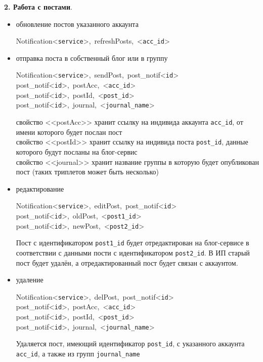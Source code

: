 {\bf 2. Работа с постами}.
\begin{itemize}
\item обновление постов указанного аккаунта

\mbox{Notification<{\tt service}>, refreshPosts, <{\tt acc\_id}>}

\item отправка поста в собственный блог или в группу

\mbox{Notification<{\tt service}>, sendPost, post\_notif<{\tt id}>}\\
\mbox{post\_notif<{\tt id}>, postAcc, <{\tt acc\_id}>}\\
\mbox{post\_notif<{\tt id}>, postId, <{\tt post\_id}>}\\
\mbox{post\_notif<{\tt id}>, journal, <{\tt journal\_name}>}

свойство <<postAcc>> хранит ссылку на индивида аккаунта {\tt acc\_id}, от имени которого будет послан пост\\
свойство <<postId>> хранит ссылку на индивида поста {\tt post\_id}, данные которого будут посланы на блог-сервис\\
свойство <<journal>> хранит название группы в которую будет опубликован пост (таких триплетов может быть несколько)

\item редактирование

\mbox{Notification<{\tt service}>, editPost, post\_notif<{\tt id}>}\\
\mbox{post\_notif<{\tt id}>, oldPost, <{\tt post1\_id}>}\\
\mbox{post\_notif<{\tt id}>, newPost, <{\tt post2\_id}>}

Пост с идентификатором {\tt post1\_id} будет отредактирован на блог-сервисе в соответствии с данными пости с идентификатором {\tt post2\_id}. В ИП старый пост будет удалён, а отредактированный пост будет связан с аккаунтом.

\item удаление


\mbox{Notification<{\tt service}>, delPost, post\_notif<{\tt id}>}\\
\mbox{post\_notif<{\tt id}>, postAcc, <{\tt acc\_id}>}\\
\mbox{post\_notif<{\tt id}>, postId, <{\tt post\_id}>}\\
\mbox{post\_notif<{\tt id}>, journal, <{\tt journal\_name}>}

Удаляется пост, имеющий идентификатор {\tt post\_id}, с указанного аккаунта {\tt acc\_id}, а также из групп {\tt journal\_name}

\end{itemize}

